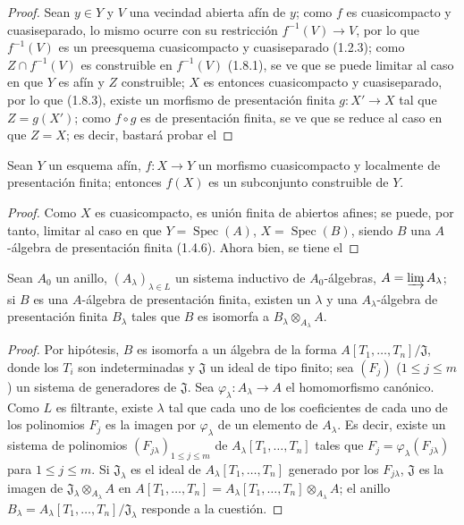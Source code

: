 \begin{proof}
Sean $y\in Y$ y $V$ una vecindad abierta afín de $y$; como $f$ es
cuasicompacto y cuasiseparado, lo mismo ocurre con su restricción
$f^{-1}(V)\to V$, por lo que $f^{-1}(V)$ es un preesquema cuasicompacto y
cuasiseparado (1.2.3); como $Z\cap f^{-1}(V)$ es construible en
$f^{-1}(V)$ (1.8.1), se ve que se puede limitar al caso en que $Y$ es afín
y $Z$ construible; $X$ es entonces cuasicompacto y cuasiseparado, por lo que
(1.8.3), existe un morfismo de presentación finita $g:X'\to X$ tal que
$Z=g(X')$; como $f\circ g$ es de presentación finita, se ve que se
reduce al caso en que $Z=X$; es decir, bastará probar el
\end{proof}

\begin{lemma}[1.8.4.1]
\label{IV.1.8.4.1-fr}
Sean $Y$ un esquema afín, $f:X\to Y$ un morfismo cuasicompacto y
localmente de presentación finita; entonces $f(X)$ es un subconjunto construible
de $Y$.
\end{lemma}

\begin{proof}
Como $X$ es cuasicompacto, es unión finita de abiertos afines; se puede,
por tanto, limitar al caso en que $Y=\operatorname{Spec}(A)$,
$X=\operatorname{Spec}(B)$, siendo $B$ una $A$-álgebra de presentación finita
(1.4.6). Ahora bien, se tiene el
\end{proof}

\begin{lemma}[1.8.4.2]
\label{IV.1.8.4.2-fr}
Sean $A_0$ un anillo, $(A_\lambda)_{\lambda\in L}$ un sistema inductivo de
$A_0$-álgebras, $A=\varinjlim A_\lambda$; si $B$ es una $A$-álgebra de
presentación finita, existen un $\lambda$ y una $A_\lambda$-álgebra de
presentación finita $B_\lambda$ tales que $B$ es isomorfa a
$B_\lambda\otimes_{A_\lambda}A$.
\end{lemma}

\begin{proof}
Por hipótesis, $B$ es isomorfa a un álgebra de la forma
$A[T_1,\ldots,T_n]/\mathfrak J$, donde los $T_i$ son indeterminadas y
$\mathfrak J$ un ideal de tipo finito; sea $(F_j)$ ($1\leq j\leq m$) un
sistema de generadores de $\mathfrak J$. Sea
$\varphi_\lambda:A_\lambda\to A$ el homomorfismo canónico. Como $L$ es
filtrante, existe $\lambda$ tal que cada uno de los coeficientes de cada uno de los
polinomios $F_j$ es la imagen por $\varphi_\lambda$ de un elemento de
$A_\lambda$. Es decir, existe un sistema de polinomios
$(F_{j\lambda})_{1\leq j\leq m}$ de $A_\lambda[T_1,\ldots,T_n]$ tales que
$F_j=\varphi_\lambda(F_{j\lambda})$ para $1\leq j\leq m$. Si
$\mathfrak J_\lambda$ es el ideal de $A_\lambda[T_1,\ldots,T_n]$ generado
por los $F_{j\lambda}$, $\mathfrak J$ es la imagen de
$\mathfrak J_\lambda\otimes_{A_\lambda}A$ en
$A[T_1,\ldots,T_n]=A_\lambda[T_1,\ldots,T_n]\otimes_{A_\lambda}A$;
el anillo $B_\lambda=A_\lambda[T_1,\ldots,T_n]/\mathfrak J_\lambda$ responde a
la cuestión.
\end{proof}

